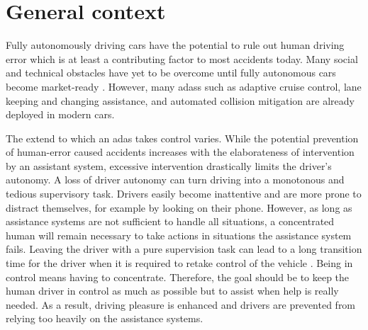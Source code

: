 \fi

%
%

\section{General context}

Fully autonomously driving cars have the potential to rule out human driving error which is at least a contributing factor to most accidents today. Many social and technical obstacles have yet to be overcome until fully autonomous cars become market-ready \parencite{autonomous_driving_book}. However, many \glspl{adas} such as adaptive cruise control, lane keeping and changing assistance, and automated collision mitigation are already deployed in modern cars. 

The extend to which an \gls{adas} takes control varies. While the potential prevention of human-error caused accidents increases with the elaborateness of intervention by an assistant system, excessive intervention drastically limits the driver's autonomy. A loss of driver autonomy can turn driving into a monotonous and tedious supervisory task. Drivers easily become inattentive and are more prone to distract themselves, for example by looking on their phone. However, as long as assistance systems are not sufficient to handle all situations, a concentrated human will remain necessary to take actions in situations the assistance system fails. Leaving the driver with a pure supervision task can lead to a long transition time for the driver when it is required to retake control of the vehicle \parencite{shared_control}. Being in control means having to concentrate. Therefore, the goal should be to keep the human driver in control as much as possible but to assist when help is really needed. As a result, driving pleasure is enhanced and drivers are prevented from relying too heavily on the assistance systems.



